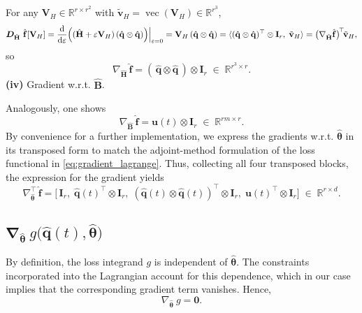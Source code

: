 For any $\mathbf{V}_H\in\mathbb{R}^{r\times r^2}$ with $\tilde{\mathbf{v}}_H=\operatorname{vec}(\mathbf{V}_H)\in\mathbb{R}^{r^3}$,\\
$$\bm{D}_{\hat{\mathbf{H}}}~\hat{\mathbf{f}}[\mathbf{V}_H]=\dv{}{\varepsilon}\Bigl((\hat{\mathbf{H}}+\varepsilon\mathbf{V}_H)\,(\hat{\mathbf{q}}\otimes\hat{\mathbf{q}})\Bigr)\Big|_{\varepsilon=0}=\mathbf{V}_H\,(\hat{\mathbf{q}}\otimes\hat{\mathbf{q}})=\langle(\hat{\mathbf{q}}\otimes\hat{\mathbf{q}})^{\top}\otimes\mathbf{I}_r,\;\tilde{\mathbf{v}}_H\rangle=\bigl(\nabla_{\hat{\mathbf{H}}}\hat{\mathbf{f}}\bigr)^{\!\top}\!\tilde{\mathbf{v}}_H,$$
so\\
$$\nabla_{\hat{\mathbf{H}}}\,\hat{\mathbf{f}}=(\,\hat{\mathbf{q}}\otimes\hat{\mathbf{q}}\,)\otimes\mathbf{I}_r\;\in\;\mathbb{R}^{r^3\times r}.$$
\noindent\textbf{(iv)} Gradient w.r.t. $\hat{\mathbf{B}}$.

Analogously, one shows\\
$$\nabla_{\hat{\mathbf{B}}}\,\hat{\mathbf{f}}=\mathbf{u}(t)\otimes\mathbf{I}_r\;\in\;\mathbb{R}^{rm\times r}.$$
By convenience for a further implementation, we express the gradients w.r.t. $\hat{\bm{\theta}}$ in its transposed form to match the adjoint-method formulation of the loss functional in \eqref{eq:gradient_lagrange}.
Thus, collecting all four transposed blocks, the expression for the gradient yields\\
\begin{equation}
  \label{eq:gradient_2}
  \nabla_{\hat{\bm{\theta}}}^{\top}\,\hat{\mathbf{f}}=\bigl[\,\mathbf{I}_r,\;\hat{\mathbf{q}}(t)^{\!\top}\otimes\mathbf{I}_r,\;(\hat{\mathbf{q}}(t)\otimes\hat{\mathbf{q}}(t))^{\!\top}\otimes\mathbf{I}_r,\;\mathbf{u}(t)^{\!\top}\otimes\mathbf{I}_r\bigr]\;\in\;\mathbb{R}^{r\times d}.
\end{equation}

\subsection{$\bm{\nabla}_{\hat{\bm{\theta}}}~g\bigl(\hat{\mathbf{q}}(t), \hat{\bm{\theta}}\bigr)$}

By definition, the loss integrand $g$ is independent of $\hat{\bm{\theta}}$. The constraints incorporated into the Lagrangian account for this dependence, which in our case implies that the corresponding gradient term vanishes. Hence,\\
\begin{equation}
    \nabla_{\hat{\bm{\theta}}}~g = \mathbf{0}.
    \label{eq:gradient_4}
\end{equation}

